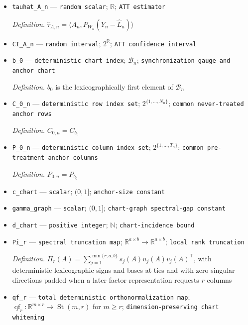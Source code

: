 \documentclass{article}
\begin{document}
\begin{itemize}
  \item \texttt{tauhat\_\allowbreak{}A\_\allowbreak{}n} --- \texttt{random scalar}; \(\mathbb R\); \texttt{ATT estimator}
  \par\smallskip\noindent\emph{Definition.} \(\widehat\tau_{A,n}=\langle A_n,P_{W_n}(Y_n-\widehat L_n)\rangle\)
  \item \texttt{CI\_\allowbreak{}A\_\allowbreak{}n} --- \texttt{random interval}; \(2^{\mathbb R}\); \texttt{ATT confidence interval}
  \item \texttt{b\_\allowbreak{}0} --- \texttt{deterministic chart index}; \(\mathcal B_n\); \texttt{synchronization gauge and anchor chart}
  \par\smallskip\noindent\emph{Definition.} \(b_0\) is the lexicographically first element of \(\mathcal B_n\)
  \item \texttt{C\_\allowbreak{}0\_\allowbreak{}n} --- \texttt{deterministic row index set}; \(2^{\{1,\ldots,N_n\}}\); \texttt{common never-\allowbreak{}treated anchor rows}
  \par\smallskip\noindent\emph{Definition.} \(C_{0,n}=C_{b_0}\)
  \item \texttt{P\_\allowbreak{}0\_\allowbreak{}n} --- \texttt{deterministic column index set}; \(2^{\{1,\ldots,T_n\}}\); \texttt{common pre-\allowbreak{}treatment anchor columns}
  \par\smallskip\noindent\emph{Definition.} \(P_{0,n}=P_{b_0}\)
  \item \texttt{c\_\allowbreak{}chart} --- \texttt{scalar}; \((0,1]\); \texttt{anchor-\allowbreak{}size constant}
  \item \texttt{gamma\_\allowbreak{}graph} --- \texttt{scalar}; \((0,1]\); \texttt{chart-\allowbreak{}graph spectral-\allowbreak{}gap constant}
  \item \texttt{d\_\allowbreak{}chart} --- \texttt{positive integer}; \(\mathbb N\); \texttt{chart-\allowbreak{}incidence bound}
  \item \texttt{Pi\_\allowbreak{}r} --- \texttt{spectral truncation map}; \(\mathbb R^{a\times b}\to\mathbb R^{a\times b}\); \texttt{local rank truncation}
  \par\smallskip\noindent\emph{Definition.} \(\Pi_r(A)=\sum_{j=1}^{\min\{r,a,b\}}s_j(A)u_j(A)v_j(A)^{\top}\), with deterministic lexicographic signs and bases at ties and with zero singular directions padded when a later factor representation requests \(r\) columns
  \item \texttt{qf\_\allowbreak{}r} --- \texttt{total deterministic orthonormalization map}; \(\operatorname{qf}_r:\mathbb R^{m\times r}\to\operatorname{St}(m,r)\) for \(m\ge r\); \texttt{dimension-\allowbreak{}preserving chart whitening}

\end{itemize}
\end{document}
